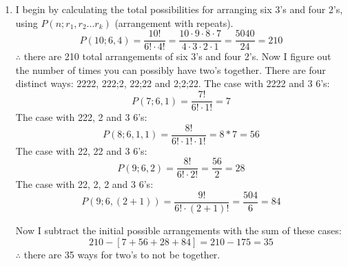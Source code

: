 \documentclass[11pt]{article}
\begin{document}
\begin{enumerate}
					      	\item {
					      		      I begin by calculating the total possibilities for arranging six 3's and four 2's, using $P(n;r_1,r_2...r_k)$ (arrangement with repeats).
					      		      \begin{equation*}
					      		      	P(10;6,4)=\frac{10!}{6!\cdot 4!}=\frac{10\cdot 9\cdot 8\cdot 7}{4\cdot 3\cdot 2\cdot 1} = \frac{5040}{24} = 210
					      		      \end{equation*}
					      		      $\therefore$ there are 210 total arrangements of six 3's and four 2's.\newline
					      		      \newline
					      		      Now I figure out the number of times you can possibly have two's together. There are four distinct ways: 2222, 222;2, 22;22 and 2;2;22.\newline
					      		      \newline
					      		      The case with 2222 and 3 6's:
					      		      \begin{equation*}
					      		      	P(7;6,1)=\frac{7!}{6!\cdot 1!} = 7
					      		      \end{equation*}
					      		      The case with 222, 2 and 3 6's:
					      		      \begin{equation*}
					      		      	P(8;6,1,1)=\frac{8!}{6!\cdot 1!\cdot 1!} =8*7=56
					      		      \end{equation*}
					      		      The case with 22, 22 and 3 6's:
					      		      \begin{equation*}
					      		      	P(9;6,2)=\frac{8!}{6!\cdot 2!}=\frac{56}{2}=28
					      		      \end{equation*}
					      		      The case with 22, 2, 2 and 3 6's:
					      		      \begin{equation*}
					      		      	P(9;6,(2 + 1))=\frac{9!}{6!\cdot (2 + 1)!}=\frac{504}{6}=84
					      		      \end{equation*}
					      		      
					      		      Now I subtract the initial possible arrangements with the sum of these cases:
					      		      \begin{equation*}
					      		      	210 - [7 + 56 + 28 + 84] = 210 - 175 = 35
					      		      \end{equation*}
					      		      $\therefore$ there are 35 ways for two's to not be together.
					      		}
					      		

\end{enumerate}
\end{document}
